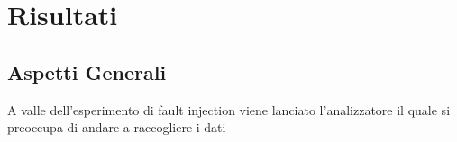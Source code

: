 \section{Risultati}\label{sec:results}
\subsection{Aspetti Generali}
A valle dell'esperimento di fault injection viene lanciato l'analizzatore il quale si preoccupa di andare a raccogliere i dati